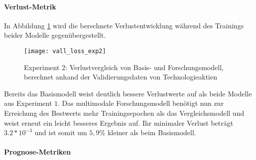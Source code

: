 \paragraph*{Verlust-Metrik} 
In Abbildung \ref{fig:vall_loss_exp2} wird die berechnete Verlustentwicklung während des Trainings beider Modelle gegenübergestellt.
\begin{figure}[H]
	\texttt{[image: vall\_loss\_exp2]}
	\caption{Experiment 2: Verlustvergleich von Basis- und Forschungsmodell, berechnet anhand der Validierungsdaten von Technologieaktien}
	\label{fig:vall_loss_exp2}
\end{figure}
Bereits das Basismodell weist deutlich bessere Verlustwerte auf als beide Modelle aus Experiment $1$. Das multimodale Forschungsmodell benötigt nun zur Erreichung des Bestwerts mehr Trainingsepochen als das Vergleichsmodell und weist erneut ein leicht besseres Ergebnis auf. Ihr minimaler Verlust beträgt $3.2*10^{-3}$ und ist somit um $5,9\%$ kleiner als beim Basismodell.

\paragraph*{Prognose-Metriken} 

